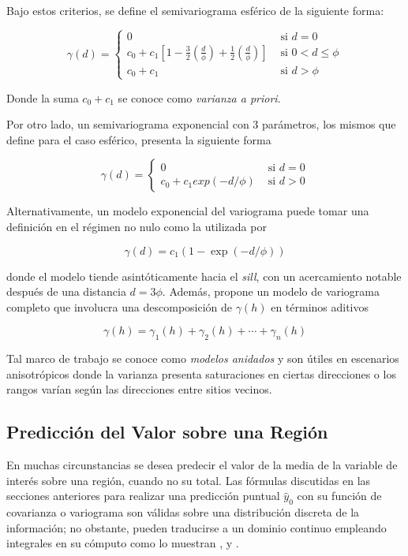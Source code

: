 \documentclass[14pt]{extarticle}
\begin{document}
Bajo estos criterios, se define el semivariograma esférico de la siguiente forma:

\begin{equation}
	\gamma (d) = \begin{cases}
	0 & \textrm{ si } d = 0 \\
	c_0 + c_1\left[1 - \frac{3}{2}\left(\frac{d}{\phi}\right) + \frac{1}{2} \left(\frac{d}{\phi}\right)\right] & \textrm{ si } 0 < d \leq \phi \\
	c_0 + c_1 & \textrm{ si } d > \phi
	\end{cases}
\end{equation}

\noindent Donde la suma $c_0 + c_1$ se conoce como \textit{varianza a priori}\cite{Brus.2022}. 

Por otro lado, un semivariograma exponencial con 3 parámetros, los mismos que \cite{Brus.2022} define para el caso esférico, presenta la siguiente forma

\begin{equation}
	\gamma(d) = \begin{cases}
	0 & \textrm{ si } d = 0\\
	c_0 + c_1 exp(-d/\phi) & \textrm{ si } d > 0
	\end{cases}
\end{equation}

Alternativamente, un modelo exponencial del variograma puede tomar una definición en el régimen no nulo como la utilizada por \cite{Hohn.1993}

$$\gamma(d) = c_1(1 - \exp(-d/\phi))$$

\noindent donde el modelo tiende asintóticamente hacia el \textit{sill}, con un acercamiento notable después de una distancia $d = 3\phi$. Además, \cite{Hohn.1993} propone un modelo de variograma completo que involucra una descomposición de $\gamma(h)$ en términos aditivos

$$\gamma(h) = \gamma_1(h) + \gamma_2(h) + \cdots + \gamma_n(h)$$

Tal marco de trabajo se conoce como \textit{modelos anidados} y son útiles en escenarios anisotrópicos donde la varianza presenta saturaciones en ciertas direcciones o los rangos varían según las direcciones entre sitios vecinos\cite{Hohn.1993}. 

\subsection{Predicción del Valor sobre una Región}
En muchas circunstancias se desea predecir el valor de la  media de la variable de interés sobre una región, cuando no su total\cite{Thompson.2012}. Las fórmulas discutidas en las secciones anteriores para realizar una predicción puntual $\hat{y}_0$ con su función de covarianza o variograma son válidas sobre una distribución discreta de la información\cite{Thompson.2012}; no obstante, pueden traducirse a un dominio continuo empleando integrales en su cómputo como lo muestran \cite{Cressie.1986}, \cite{Grondona.1991} y \cite{Thompson.2012}.  
\end{document}
